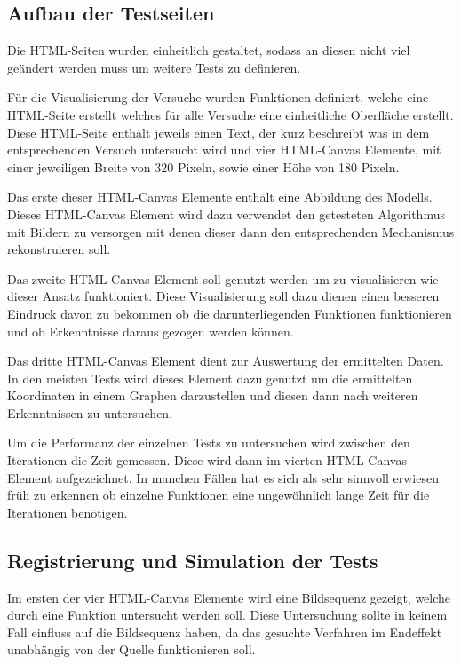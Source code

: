 \subsection{Aufbau der Testseiten}

Die HTML-Seiten wurden einheitlich gestaltet, sodass an diesen nicht viel geändert werden muss um weitere Tests zu definieren.

Für die Visualisierung der Versuche wurden Funktionen definiert, welche eine HTML-Seite erstellt welches für alle Versuche eine einheitliche Oberfläche erstellt.
Diese HTML-Seite enthält jeweils einen Text, der kurz beschreibt was in dem entsprechenden Versuch untersucht wird und vier HTML-Canvas Elemente, mit einer jeweiligen Breite von 320 Pixeln, sowie einer Höhe von 180 Pixeln.

Das erste dieser HTML-Canvas Elemente enthält eine Abbildung des  Modells.
Dieses HTML-Canvas Element wird dazu verwendet den getesteten Algorithmus mit Bildern zu versorgen mit denen dieser dann den entsprechenden Mechanismus rekonstruieren soll.

Das zweite HTML-Canvas Element soll genutzt werden um zu visualisieren wie dieser Ansatz funktioniert.
Diese Visualisierung soll dazu dienen einen besseren Eindruck davon zu bekommen ob die darunterliegenden Funktionen funktionieren und ob Erkenntnisse daraus gezogen werden können.

Das dritte HTML-Canvas Element dient zur Auswertung der ermittelten Daten.
In den meisten Tests wird dieses Element dazu genutzt um die ermittelten Koordinaten in einem Graphen darzustellen und diesen dann nach weiteren Erkenntnissen zu untersuchen.

Um die Performanz der einzelnen Tests zu untersuchen wird zwischen den Iterationen die Zeit gemessen.
Diese wird dann im vierten HTML-Canvas Element aufgezeichnet.
In manchen Fällen hat es sich als sehr sinnvoll erwiesen früh zu erkennen ob einzelne Funktionen eine ungewöhnlich lange Zeit für die Iterationen benötigen.

\subsection{Registrierung und Simulation der Tests}

Im ersten der vier HTML-Canvas Elemente wird eine Bildsequenz gezeigt, welche durch eine Funktion untersucht werden soll.
Diese Untersuchung sollte in keinem Fall einfluss auf die Bildsequenz haben, da das gesuchte Verfahren im Endeffekt unabhängig von der Quelle funktionieren soll.

